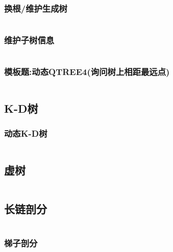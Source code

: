 \documentclass[a4paper]{article}
\begin{document}
\begin{multicols}{2}
				\subsubsection{换根/维护生成树}
					\inputminted{cpp}{../src/datastructure/LCT(换根).cpp}

				\subsubsection{维护子树信息}
					\inputminted{cpp}{../src/datastructure/LCT维护子树信息.cpp}
					
				\subsubsection{模板题:动态QTREE4(询问树上相距最远点)}
						\inputminted{cpp}{../src/datastructure/动态QTREE4.cpp}
	
			\subsection{K-D树}

				
				\subsubsection{动态K-D树}
					\inputminted{cpp}{../src/datastructure/动态KD树.cpp}
	
	
	
			
	
			\subsection{虚树}
				\inputminted{cpp}{../src/datastructure/虚树.cpp}
	
			\subsection{长链剖分}
				\inputminted{cpp}{../src/datastructure/长链剖分.cpp}
	
			\subsubsection{梯子剖分}
				\inputminted{cpp}{../src/datastructure/梯子剖分.cpp}
					

\end{multicols}
\end{document}
